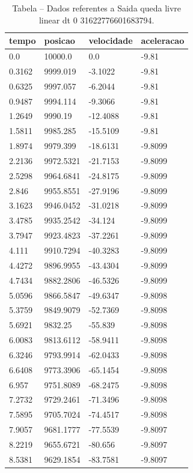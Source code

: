 \begin{table}[H]
\centering
\caption{Tabela – Dados referentes a Saida queda livre linear dt 0 31622776601683794.}
\label{tab:saida_queda_livre_linear_dt_0_31622776601683794}
\begin{tabular}{llll}
\toprule
tempo & posicao & velocidade & aceleracao \\
\midrule
0.0 & 10000.0 & 0.0 & -9.81 \\
0.3162 & 9999.019 & -3.1022 & -9.81 \\
0.6325 & 9997.057 & -6.2044 & -9.81 \\
0.9487 & 9994.114 & -9.3066 & -9.81 \\
1.2649 & 9990.19 & -12.4088 & -9.81 \\
1.5811 & 9985.285 & -15.5109 & -9.81 \\
1.8974 & 9979.399 & -18.6131 & -9.8099 \\
2.2136 & 9972.5321 & -21.7153 & -9.8099 \\
2.5298 & 9964.6841 & -24.8175 & -9.8099 \\
2.846 & 9955.8551 & -27.9196 & -9.8099 \\
3.1623 & 9946.0452 & -31.0218 & -9.8099 \\
3.4785 & 9935.2542 & -34.124 & -9.8099 \\
3.7947 & 9923.4823 & -37.2261 & -9.8099 \\
4.111 & 9910.7294 & -40.3283 & -9.8099 \\
4.4272 & 9896.9955 & -43.4304 & -9.8099 \\
4.7434 & 9882.2806 & -46.5326 & -9.8099 \\
5.0596 & 9866.5847 & -49.6347 & -9.8098 \\
5.3759 & 9849.9079 & -52.7369 & -9.8098 \\
5.6921 & 9832.25 & -55.839 & -9.8098 \\
6.0083 & 9813.6112 & -58.9411 & -9.8098 \\
6.3246 & 9793.9914 & -62.0433 & -9.8098 \\
6.6408 & 9773.3906 & -65.1454 & -9.8098 \\
6.957 & 9751.8089 & -68.2475 & -9.8098 \\
7.2732 & 9729.2461 & -71.3496 & -9.8098 \\
7.5895 & 9705.7024 & -74.4517 & -9.8098 \\
7.9057 & 9681.1777 & -77.5539 & -9.8097 \\
8.2219 & 9655.6721 & -80.656 & -9.8097 \\
8.5381 & 9629.1854 & -83.7581 & -9.8097 \\

\end{tabular}
\end{table}
